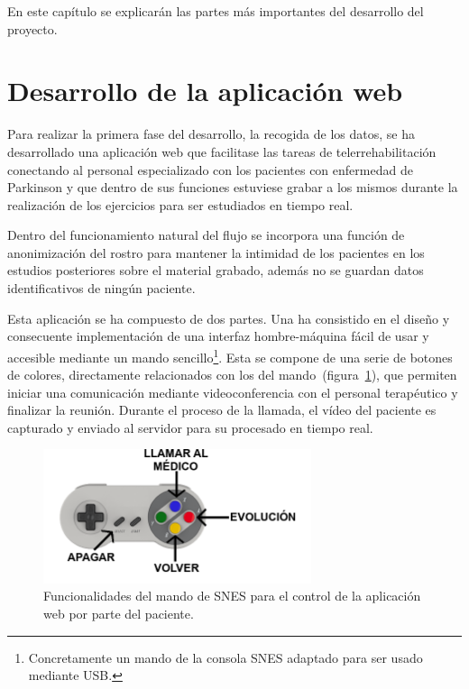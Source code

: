 \label{cap:relevantes}

En este capítulo se explicarán las partes más importantes del desarrollo del proyecto.

\section{Desarrollo de la aplicación web}

Para realizar la primera fase del desarrollo, la recogida de los datos, se ha desarrollado una aplicación web que facilitase las tareas de telerrehabilitación conectando al personal especializado con los pacientes con enfermedad de Parkinson y que dentro de sus funciones estuviese grabar a los mismos durante la realización de los ejercicios para ser estudiados en tiempo real. 

Dentro del funcionamiento natural del flujo se incorpora una función de anonimización del rostro para mantener la intimidad de los pacientes en los estudios posteriores sobre el material grabado, además no se guardan datos identificativos de ningún paciente.

Esta aplicación se ha compuesto de dos partes. Una ha consistido en el diseño y consecuente implementación de una interfaz hombre-máquina fácil de usar y accesible mediante un mando sencillo\footnote{Concretamente un mando de la consola SNES adaptado para ser usado mediante USB.}. Esta se compone de una serie de botones de colores, directamente relacionados con los del mando~(figura~\ref{fig:help}), que permiten iniciar una comunicación mediante videoconferencia con el personal terapéutico y finalizar la reunión. Durante el proceso de la llamada, el vídeo del paciente es capturado y enviado al servidor para su procesado en tiempo real.

\begin{figure}
	\centering
	\includegraphics[width=0.7\textwidth]{img/ayuda.png}
	\caption{Funcionalidades del mando de SNES para el control de la aplicación web por parte del paciente.}
	\label{fig:help}
\end{figure}


